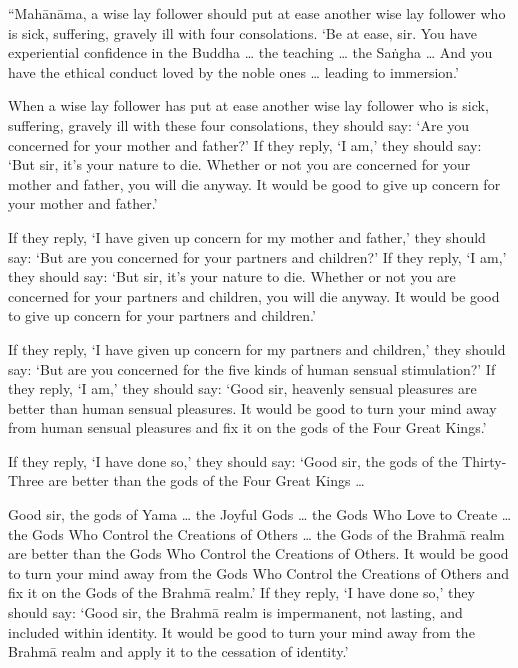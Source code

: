 \documentclass[12pt,openany]{book}%
\begin{document}
“\textsanskrit{Mahānāma}, a wise lay follower should put at ease another wise lay follower who is sick, suffering, gravely ill with four consolations. ‘Be at ease, sir. You have experiential confidence in the Buddha … the teaching … the \textsanskrit{Saṅgha} … And you have the ethical conduct loved by the noble ones … leading to immersion.’ 

When a wise lay follower has put at ease another wise lay follower who is sick, suffering, gravely ill with these four consolations, they should say: ‘Are you concerned for your mother and father?’ If they reply, ‘I am,’ they should say: ‘But sir, it’s your nature to die. Whether or not you are concerned for your mother and father, you will die anyway. It would be good to give up concern for your mother and father.’ 

If they reply, ‘I have given up concern for my mother and father,’ they should say: ‘But are you concerned for your partners and children?’ If they reply, ‘I am,’ they should say: ‘But sir, it’s your nature to die. Whether or not you are concerned for your partners and children, you will die anyway. It would be good to give up concern for your partners and children.’ 

If they reply, ‘I have given up concern for my partners and children,’ they should say: ‘But are you concerned for the five kinds of human sensual stimulation?’ If they reply, ‘I am,’ they should say: ‘Good sir, heavenly sensual pleasures are better than human sensual pleasures. It would be good to turn your mind away from human sensual pleasures and fix it on the gods of the Four Great Kings.’ 

If they reply, ‘I have done so,’ they should say: ‘Good sir, the gods of the Thirty-Three are better than the gods of the Four Great Kings … 

Good sir, the gods of Yama … the Joyful Gods … the Gods Who Love to Create … the Gods Who Control the Creations of Others … the Gods of the \textsanskrit{Brahmā} realm are better than the Gods Who Control the Creations of Others. It would be good to turn your mind away from the Gods Who Control the Creations of Others and fix it on the Gods of the \textsanskrit{Brahmā} realm.’ If they reply, ‘I have done so,’ they should say: ‘Good sir, the \textsanskrit{Brahmā} realm is impermanent, not lasting, and included within identity. It would be good to turn your mind away from the \textsanskrit{Brahmā} realm and apply it to the cessation of identity.’ 
\end{document}
